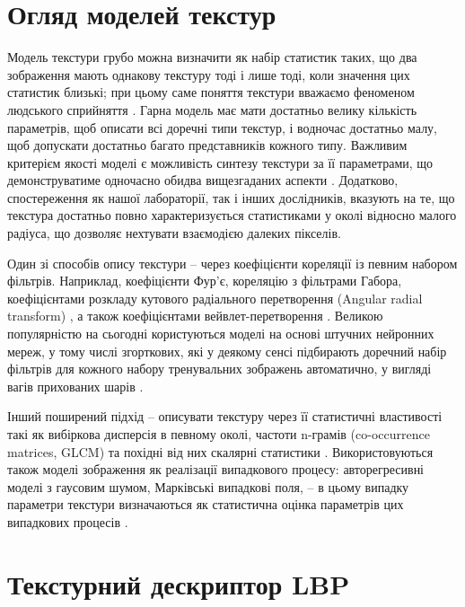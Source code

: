 
\section{Огляд моделей текстур}\label{section1.overview}

Модель текстури грубо можна визначити як набір статистик таких, що два зображення мають однакову текстуру тоді і лише тоді, коли значення цих статистик близькі;
при цьому саме поняття текстури вважаємо феноменом людського сприйняття \cite{julesz1981}.
Гарна модель має мати достатньо велику кількість параметрів, щоб описати всі доречні типи текстур, 
і водночас достатньо малу, щоб допускати достатньо багато представників кожного типу.
Важливим критерієм якості моделі є можливість синтезу текстури за її параметрами, 
що демонструватиме одночасно обидва вищезгаданих аспекти \cite{simoncelli1998}. 
Додатково, спостереження як нашої лабораторії, так і інших дослідників, вказують на те, що текстура достатньо повно характеризується
статистиками у околі відносно малого радіуса, що дозволяє нехтувати взаємодією далеких пікселів.

Один зі способів опису текстури -- через коефіцієнти кореляції із певним набором фільтрів. 
Наприклад, коефіцієнти Фур'є, кореляцію з фільтрами Габора, коефіцієнтами розкладу 
кутового радіального перетворення (Angular radial transform) \cite{bober2001},
а також коефіцієнтами вейвлет-перетворення \cite{portilla2000}.
Великою популярністю на сьогодні користуються моделі на основі штучних нейронних мереж, у тому числі згорткових,  
які у деякому сенсі підбирають доречний набір фільтрів для кожного набору тренувальних зображень автоматично, 
у вигляді вагів прихованих шарів \cite{Wang_2018_CVPR}.

Інший поширений підхід -- описувати текстуру через її статистичні властивості такі як вибіркова дисперсія в певному околі,
частоти n-грамів (co-occurrence matrices, GLCM) та похідні від них скалярні статистики \cite{belsare2015}. 
Використовуються також моделі зображення як реалізації випадкового процесу: авторегресивні моделі з гаусовим шумом, 
Марківські випадкові поля, -- в цьому випадку параметри текстури визначаються як статистична оцінка параметрів цих випадкових процесів \cite{huawudeng2004, kashyap1986}. 

\section{Текстурний дескриптор LBP}\label{section1.lbp}

